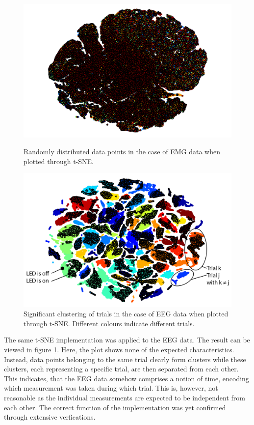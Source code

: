 \documentclass{article} %
\begin{document}
\begin{figure}
	\centering
	\begin{minipage}{0.5\textwidth}
		\centering
		\includegraphics[width=1.0\textwidth]{images/emg_tsne.png}
		\caption{Randomly distributed data points in the case of EMG data when plotted through t-SNE.}
		\label{fig:emg_tsne}
	\end{minipage}\hfill
	\begin{minipage}{0.49\textwidth}
		\centering
		\includegraphics[width=1.0\textwidth]{images/eeg_tsne.png}
		\caption{Significant clustering of trials in the case of EEG data when plotted through t-SNE. Different colours indicate different trials.}
		\label{fig:eeg_tsne}
	\end{minipage}
\end{figure}

The same t-SNE implementation was applied to the EEG data. The result can be viewed in figure \ref{fig:eeg_tsne}. Here, the plot shows none of the expected characteristics. Instead, data points belonging to the same trial clearly form clusters while these clusters, each representing a specific trial, are then separated from each other. This indicates, that the EEG data somehow comprises a notion of time, encoding which measurement was taken during which trial. This is, however, not reasonable as the individual measurements are expected to be independent from each other. The correct function of the implementation was yet confirmed through extensive verfications.
\end{document}
